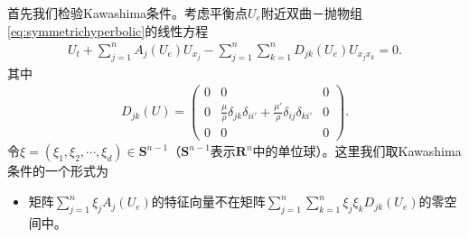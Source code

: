首先我们检验Kawashima条件。考虑平衡点$U_e$附近双曲－抛物组\eqref{eq:symmetrichyperbolic}的线性方程
\begin{eqnarray}\label{eq:symmtrickawashima}
  U_t + \sum_{j=1}^n A_j(U_e) U_{x_j} -\sum_{j=1}^n \sum_{k=1}^n D_{jk}(U_e) U_{x_j x_k}=  0.
\end{eqnarray}
其中
\begin{eqnarray*}
  D_{jk}(U) = \left( \begin{array}{ccc} 0 & 0 & 0 \\ 0 & \frac{\mu}{\rho} \delta_{jk} \delta_{ii'} + \frac{\mu'}{\rho} \delta_{ij}\delta_{ki'}& 0 \\ 0 & 0 & 0 \end{array} \right).
\end{eqnarray*}
令$\xi=(\xi_1, \xi_2, \cdots, \xi_d)\in \mathbf{S}^{n-1}$（$\mathbf{S}^{n-1}$表示$\mathbf{R}^{n}$中的单位球）。这里我们取Kawashima条件的一个形式为
\begin{itemize}
    \item 矩阵$ \sum_{j=1}^n \xi_j A_j(U_e)$的特征向量不在矩阵$\sum_{j=1}^n \sum_{k=1}^n \xi_j \xi_k D_{jk}(U_e)$的零空间中。
\end{itemize}

